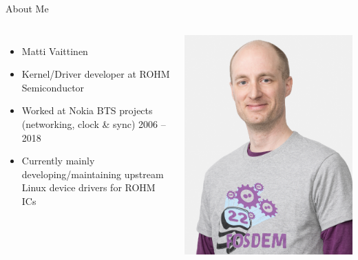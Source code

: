 \documentclass[10pt]{beamer}
\begin{document}
\begin{frame}{About Me}
	\begin{columns}
		\begin{itemize}
			\item Matti Vaittinen
			\item Kernel/Driver developer at ROHM Semiconductor
			\item Worked at Nokia BTS projects (networking, clock \& sync) 2006 – 2018
			\item Currently mainly developing/maintaining upstream Linux device drivers for ROHM ICs
		\end{itemize}
		\includegraphics[width=1\linewidth]{img/me.png}
	\end{columns}
\end{frame}
\end{document}
